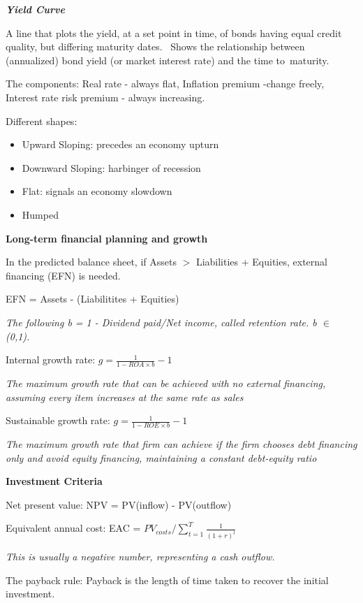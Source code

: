 \documentclass{article}
\newcommand{\bigtitle}[1]{
	\noindent
	\textbf{#1}
}
\newcommand{\smalltitle}[1]{
	\noindent
	\textbf{\textit{#1}}
}
\begin{document}
\smalltitle{Yield Curve}

A line that plots the yield, at a set point in time, of bonds having equal credit quality, but differing maturity dates.  
Shows the relationship between (annualized) bond yield (or market interest rate) and the time to maturity.

The components: Real rate - always flat, Inflation premium -change freely, Interest rate risk premium - always increasing.

Different shapes: 
\begin{itemize}
	\item Upward Sloping: precedes an economy upturn
	\item Downward Sloping: harbinger of recession
	\item Flat: signals an economy slowdown
	\item Humped
\end{itemize}



\bigtitle{Long-term financial planning and growth}

In the predicted balance sheet, if Assets $>$ Liabilities + Equities, external financing (EFN) is needed.

EFN = Assets - (Liabilitites + Equities)

\textit{The following b = 1 - Dividend paid/Net income, called retention rate. b $\in$ (0,1).}

Internal growth rate: $g = \frac{1}{1-ROA\times b} - 1$

\textit{The maximum growth rate that can be achieved with no external financing, assuming every item increases at the same rate as sales}

Sustainable growth rate: $g = \frac{1}{1-ROE\times b} - 1$

\textit{The maximum growth rate that firm can achieve if the firm chooses debt financing only and avoid equity financing, maintaining a constant debt-equity ratio}



\bigtitle{Investment Criteria}

Net present value: NPV = PV(inflow) - PV(outflow)

Equivalent annual cost: EAC = $PV_{costs}/\sum_{t=1}^{T}\frac{1}{(1+r)^t}$ 

\textit{This is usually a negative number, representing a cash outflow.}

The payback rule: Payback is the length of time taken to recover the initial investment.
\end{document}
